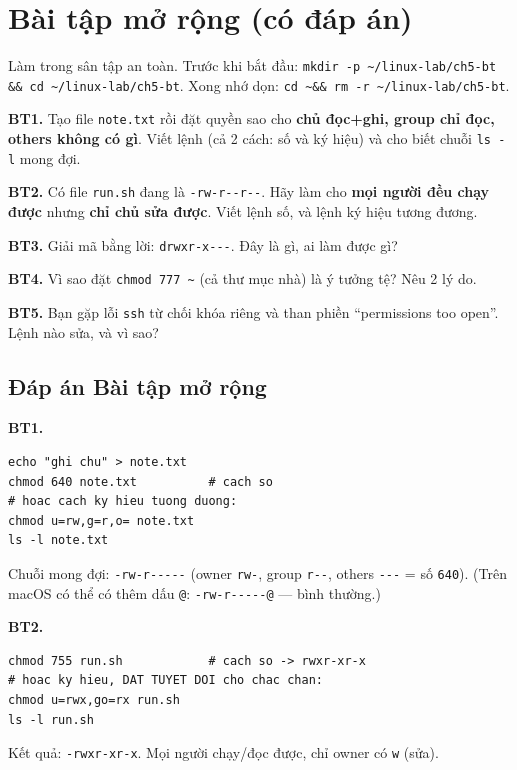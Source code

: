 \documentclass[12pt,a4paper]{article}
\newcommand{\cmd}[1]{\texttt{#1}}
\begin{document}
\section{Bài tập mở rộng (có đáp án)}

\begin{labbox}
Làm trong sân tập an toàn. Trước khi bắt đầu:
\cmd{mkdir -p \textasciitilde/linux-lab/ch5-bt \&\& cd \textasciitilde/linux-lab/ch5-bt}.
Xong nhớ dọn:
\cmd{cd \textasciitilde \&\& rm -r \textasciitilde/linux-lab/ch5-bt}.
\end{labbox}

\textbf{BT1.} Tạo file \cmd{note.txt} rồi đặt quyền sao cho \textbf{chủ đọc+ghi,
group chỉ đọc, others không có gì}. Viết lệnh (cả 2 cách: số và ký hiệu) và cho biết
chuỗi \cmd{ls -l} mong đợi.

\textbf{BT2.} Có file \cmd{run.sh} đang là \cmd{-rw-r-{}-r-{}-}. Hãy làm cho
\textbf{mọi người đều chạy được} nhưng \textbf{chỉ chủ sửa được}. Viết lệnh số, và
lệnh ký hiệu tương đương.

\textbf{BT3.} Giải mã bằng lời: \cmd{drwxr-x-{}-{}-}. Đây là gì, ai làm được gì?

\textbf{BT4.} Vì sao đặt \cmd{chmod 777 \textasciitilde} (cả thư mục nhà) là ý tưởng
tệ? Nêu 2 lý do.

\textbf{BT5.} Bạn gặp lỗi \cmd{ssh} từ chối khóa riêng và than phiền ``permissions too
open''. Lệnh nào sửa, và vì sao?

\subsection*{Đáp án Bài tập mở rộng}

\textbf{BT1.}
\begin{Verbatim}
echo "ghi chu" > note.txt
chmod 640 note.txt          # cach so
# hoac cach ky hieu tuong duong:
chmod u=rw,g=r,o= note.txt
ls -l note.txt
\end{Verbatim}
Chuỗi mong đợi: \cmd{-rw-r-{}-{}-{}-{}-} (owner \cmd{rw-}, group \cmd{r-{}-}, others
\cmd{-{}-{}-} = số \cmd{640}). (Trên macOS có thể có thêm dấu \cmd{@}:
\cmd{-rw-r-{}-{}-{}-{}-@} --- bình thường.)

\textbf{BT2.}
\begin{Verbatim}
chmod 755 run.sh            # cach so -> rwxr-xr-x
# hoac ky hieu, DAT TUYET DOI cho chac chan:
chmod u=rwx,go=rx run.sh
ls -l run.sh
\end{Verbatim}
Kết quả: \cmd{-rwxr-xr-x}. Mọi người chạy/đọc được, chỉ owner có \cmd{w} (sửa).
\end{document}
